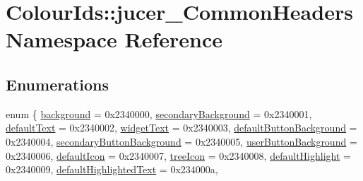 \hypertarget{namespaceColourIds_1_1jucer__CommonHeaders}{}\section{Colour\+Ids\+:\+:jucer\+\_\+\+Common\+Headers Namespace Reference}
\label{namespaceColourIds_1_1jucer__CommonHeaders}
\subsection*{Enumerations}
\begin{DoxyCompactItemize}
\item 
enum \{ \newline
\mbox{\hyperlink{namespaceColourIds_1_1jucer__CommonHeaders_a5ad0cf76718d01566ca67c5481641274abbceeb7429286d51e6d8ecd92e451f68}{background}} = 0x2340000, 
\mbox{\hyperlink{namespaceColourIds_1_1jucer__CommonHeaders_a5ad0cf76718d01566ca67c5481641274a3f64cc609d41f8443a338a63857599ac}{secondary\+Background}} = 0x2340001, 
\mbox{\hyperlink{namespaceColourIds_1_1jucer__CommonHeaders_a5ad0cf76718d01566ca67c5481641274a2d27979960663caf036ab43807233683}{default\+Text}} = 0x2340002, 
\mbox{\hyperlink{namespaceColourIds_1_1jucer__CommonHeaders_a5ad0cf76718d01566ca67c5481641274abb5566c73458b7b6c4841ccd15d5e3bb}{widget\+Text}} = 0x2340003, 
\newline
\mbox{\hyperlink{namespaceColourIds_1_1jucer__CommonHeaders_a5ad0cf76718d01566ca67c5481641274ae2ef917c731828ecb60e236b531afbeb}{default\+Button\+Background}} = 0x2340004, 
\mbox{\hyperlink{namespaceColourIds_1_1jucer__CommonHeaders_a5ad0cf76718d01566ca67c5481641274a5da87a47ed6d13ba0c4f27d16af61ca8}{secondary\+Button\+Background}} = 0x2340005, 
\mbox{\hyperlink{namespaceColourIds_1_1jucer__CommonHeaders_a5ad0cf76718d01566ca67c5481641274a17f4e6f5a54f3f618b2b4600e59b4ac6}{user\+Button\+Background}} = 0x2340006, 
\mbox{\hyperlink{namespaceColourIds_1_1jucer__CommonHeaders_a5ad0cf76718d01566ca67c5481641274ab8e59297ef480772ecbeccd0707d086e}{default\+Icon}} = 0x2340007, 
\newline
\mbox{\hyperlink{namespaceColourIds_1_1jucer__CommonHeaders_a5ad0cf76718d01566ca67c5481641274a7aeb9a222a3e09dd52bfed4d9b321804}{tree\+Icon}} = 0x2340008, 
\mbox{\hyperlink{namespaceColourIds_1_1jucer__CommonHeaders_a5ad0cf76718d01566ca67c5481641274a170d8f93b72dc0a9795bbc5af845263f}{default\+Highlight}} = 0x2340009, 
\mbox{\hyperlink{namespaceColourIds_1_1jucer__CommonHeaders_a5ad0cf76718d01566ca67c5481641274a01ad5bd9de266791f37aae2c19a9e304}{default\+Highlighted\+Text}} = 0x234000a, 

\end{DoxyCompactItemize}
